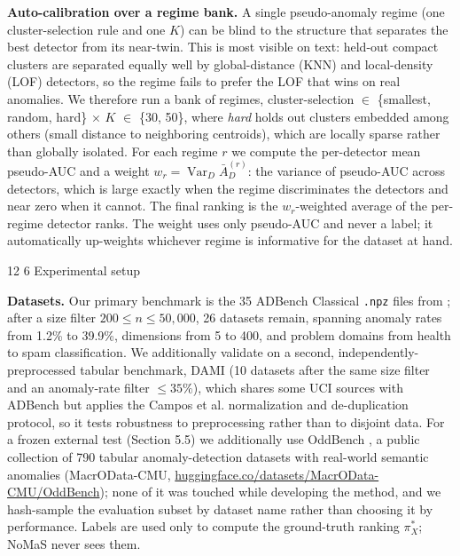 \documentclass[3p,twocolumn]{elsarticle}
\makeatletter
\renewcommand\section{\@startsection{section}{1}{\z@}%
           {12\p@ \@plus 4\p@ \@minus 4\p@}%
           {6\p@ \@plus 4\p@ \@minus 3\p@}%
           {\normalsize\bfseries\boldmath}}
\makeatother
\begin{document}
\textbf{Auto-calibration over a regime bank.} A single pseudo-anomaly regime (one cluster-selection rule and one \(K\)) can be blind to the structure that separates the best detector from its near-twin. This is most visible on text: held-out compact clusters are separated equally well by global-distance (KNN) and local-density (LOF) detectors, so the regime fails to prefer the LOF that wins on real anomalies. We therefore run a bank of regimes, cluster-selection $\in$ \{smallest, random, hard\} $\times$ \(K\) $\in$ \{30, 50\}, where \emph{hard} holds out clusters embedded among others (small distance to neighboring centroids), which are locally sparse rather than globally isolated. For each regime \(r\) we compute the per-detector mean pseudo-AUC and a weight \(w_r = \operatorname{Var}_D \bar A_{D}^{(r)}\): the variance of pseudo-AUC across detectors, which is large exactly when the regime discriminates the detectors and near zero when it cannot. The final ranking is the \(w_r\)-weighted average of the per-regime detector ranks. The weight uses only pseudo-AUC and never a label; it automatically up-weights whichever regime is informative for the dataset at hand.

\section{Experimental setup}\label{4-experimental-setup}

\textbf{Datasets.} Our primary benchmark is the 35 ADBench Classical \texttt{.npz} files from \cite{ref5}; after a size filter \(200 \le n \le 50{,}000\), 26 datasets remain, spanning anomaly rates from 1.2\% to 39.9\%, dimensions from 5 to 400, and problem domains from health to spam classification. We additionally validate on a second, independently-preprocessed tabular benchmark, DAMI \cite{ref16} (10 datasets after the same size filter and an anomaly-rate filter \(\le 35\%\)), which shares some UCI sources with ADBench but applies the Campos et al. normalization and de-duplication protocol, so it tests robustness to preprocessing rather than to disjoint data. For a frozen external test (Section 5.5) we additionally use OddBench \cite{ref22}, a public collection of 790 tabular anomaly-detection datasets with real-world semantic anomalies (MacrOData-CMU, \href{https://huggingface.co/datasets/MacrOData-CMU/OddBench}{huggingface.co/datasets/MacrOData-CMU/OddBench}); none of it was touched while developing the method, and we hash-sample the evaluation subset by dataset name rather than choosing it by performance. Labels are used only to compute the ground-truth ranking \(\pi_X^*\); NoMaS never sees them.
\end{document}
